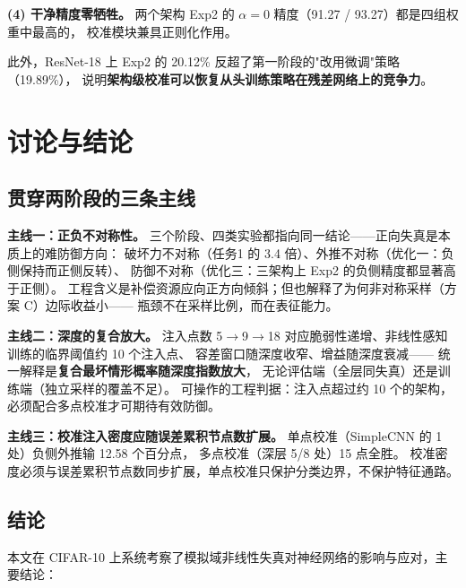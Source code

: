 \documentclass[11pt,a4paper]{ctexart}
\begin{document}
\textbf{(4) 干净精度零牺牲。}
两个架构 Exp2 的 $\alpha=0$ 精度（91.27 / 93.27）都是四组权重中最高的，
校准模块兼具正则化作用。

此外，ResNet-18 上 Exp2 的 20.12\% 反超了第一阶段的"改用微调"策略（19.89\%），
说明\textbf{架构级校准可以恢复从头训练策略在残差网络上的竞争力}。

\section{讨论与结论}

\subsection{贯穿两阶段的三条主线}

\textbf{主线一：正负不对称性。}
三个阶段、四类实验都指向同一结论——正向失真是本质上的难防御方向：
破坏力不对称（任务1 的 3.4 倍）、外推不对称（优化一：负侧保持而正侧反转）、
防御不对称（优化三：三架构上 Exp2 的负侧精度都显著高于正侧）。
工程含义是补偿资源应向正方向倾斜；但也解释了为何非对称采样（方案 C）边际收益小——
瓶颈不在采样比例，而在表征能力。

\textbf{主线二：深度的复合放大。}
注入点数 5$\to$9$\to$18 对应脆弱性递增、非线性感知训练的临界阈值约 10 个注入点、
容差窗口随深度收窄、增益随深度衰减——
统一解释是\textbf{复合最坏情形概率随深度指数放大}，
无论评估端（全层同失真）还是训练端（独立采样的覆盖不足）。
可操作的工程判据：注入点超过约 10 个的架构，必须配合多点校准才可期待有效防御。

\textbf{主线三：校准注入密度应随误差累积节点数扩展。}
单点校准（SimpleCNN 的 1 处）负侧外推输 12.58 个百分点，
多点校准（深层 5/8 处）15 点全胜。
校准密度必须与误差累积节点数同步扩展，单点校准只保护分类边界，不保护特征通路。

\subsection{结论}

本文在 CIFAR-10 上系统考察了模拟域非线性失真对神经网络的影响与应对，主要结论：
\end{document}
